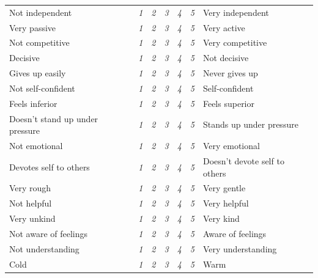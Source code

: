 \documentclass[serif, authordate, twocolumn, empirical]{jote-article}
\begin{document}
\begingroup
\renewcommand{\arraystretch}{{0.1}}
\begin{table}[h] \sffamily
\begin{tabularx}{\columnwidth}{@{}p{}p{}p{}p{}p{}p{}p{}@{}}
\hline
Not independent & \textit{1} & \textit{2} & \textit{3} & \textit{4} & \textit{5} & Very independent \\
Very passive                    & \textit{1} & \textit{2} & \textit{3} & \textit{4} & \textit{5} & Very active                   \\
Not competitive                 & \textit{1} & \textit{2} & \textit{3} & \textit{4} & \textit{5} & Very competitive              \\
Decisive                        & \textit{1} & \textit{2} & \textit{3} & \textit{4} & \textit{5} & Not decisive                  \\
Gives up easily                 & \textit{1} & \textit{2} & \textit{3} & \textit{4} & \textit{5} & Never gives up                \\
Not self-confident              & \textit{1} & \textit{2} & \textit{3} & \textit{4} & \textit{5} & Self-confident                \\
Feels inferior                  & \textit{1} & \textit{2} & \textit{3} & \textit{4} & \textit{5} & Feels superior                \\
Doesn’t stand up under pressure & \textit{1} & \textit{2} & \textit{3} & \textit{4} & \textit{5} & Stands up under pressure      \\
Not emotional                   & \textit{1} & \textit{2} & \textit{3} & \textit{4} & \textit{5} & Very emotional                \\
Devotes self to others          & \textit{1} & \textit{2} & \textit{3} & \textit{4} & \textit{5} & Doesn’t devote self to others \\
Very rough                      & \textit{1} & \textit{2} & \textit{3} & \textit{4} & \textit{5} & Very gentle                   \\
Not helpful                     & \textit{1} & \textit{2} & \textit{3} & \textit{4} & \textit{5} & Very helpful                  \\
Very unkind                     & \textit{1} & \textit{2} & \textit{3} & \textit{4} & \textit{5} & Very kind                     \\
Not aware of feelings           & \textit{1} & \textit{2} & \textit{3} & \textit{4} & \textit{5} & Aware of feelings             \\
Not understanding               & \textit{1} & \textit{2} & \textit{3} & \textit{4} & \textit{5} & Very understanding            \\
Cold                            & \textit{1} & \textit{2} & \textit{3} & \textit{4} & \textit{5} & Warm                         
\end{tabularx}
\end{table}
\end{document}
